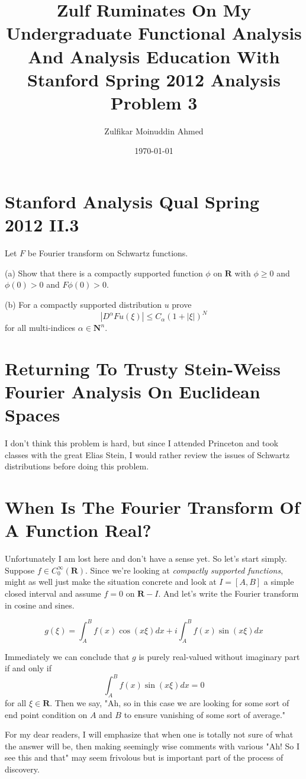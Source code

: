\documentclass{amsart}
\title{Zulf Ruminates On My Undergraduate Functional Analysis And Analysis Education With Stanford Spring 2012 Analysis Problem 3}
\author{Zulfikar Moinuddin Ahmed}
\date{\today}
\begin{document}
\maketitle

\section{Stanford Analysis Qual Spring 2012 II.3}

Let $F$ be Fourier transform on Schwartz functions.

(a) Show that there is a compactly supported function $\phi$ on $\mathbf{R}$ with $\phi\ge 0$ and $\phi(0)>0$ and $F\phi(0) >0$.

(b) For a compactly supported distribution $u$ prove
\[
|D^{\alpha} Fu(\xi)| \le C_{\alpha}(1+|\xi|)^N
\]
for all multi-indices $\alpha \in \mathbf{N}^n$.


\section{Returning To Trusty Stein-Weiss Fourier Analysis On Euclidean Spaces}

I don't think this problem is hard, but since I attended Princeton and took classes with the great Elias Stein, I would rather review the issues of Schwartz  distributions before doing this problem.  

\section{When Is The Fourier Transform Of  A Function Real?}

Unfortunately I am lost here and don't have a sense yet.  So let's start simply.  Suppose $f \in C^{\infty}_0(\mathbf{R})$.  Since we're looking at {\em compactly supported functions}, might as well just make the situation concrete and look at $I=[A,B]$ a simple closed interval and assume $f=0$ on $\mathbf{R}-I$.  And let's write the Fourier transform in cosine and sines.

\[
g(\xi) = \int_A^B f(x) \cos(x\xi) dx + i \int_A^B f(x) \sin(x \xi) dx
\]

Immediately we can conclude that $g$ is purely real-valued without imaginary part if and only if 
\[
\int_A^B f(x) \sin(x\xi) dx = 0
\]
for all $\xi \in \mathbf{R}$.  Then we say, "Ah, so in this case we are looking for some sort of end point condition on $A$ and $B$ to ensure vanishing of some sort of average."  

For my dear readers, I will emphasize that when one is totally not sure of what the answer will be, then making seemingly wise comments with various "Ah! So I see this and that" may seem frivolous but is important part of the process of discovery.  
\end{document}
